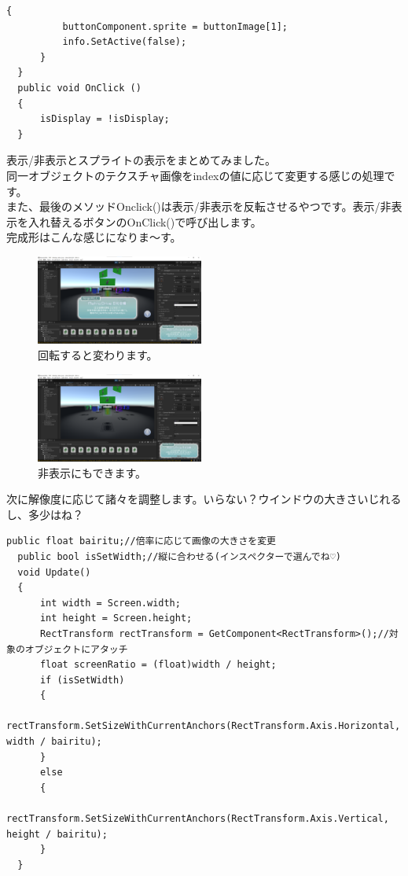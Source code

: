 \documentclass[b5paper,9pt,platex,dvipdfmx]{jsarticle}
\begin{document}
\begin{multicols*}{3}
\begin{lstlisting}[caption=UIDraw.cs]
      {
          buttonComponent.sprite = buttonImage[1];
          info.SetActive(false);
      }
  }
  public void OnClick ()
  {
      isDisplay = !isDisplay;
  }
\end{lstlisting}
表示/非表示とスプライトの表示をまとめてみました。\\
同一オブジェクトのテクスチャ画像をindexの値に応じて変更する感じの処理です。\\
また、最後のメソッドOnclick()は表示/非表示を反転させるやつです。表示/非表示を入れ替えるボタンのOnClick()で呼び出します。\\
完成形はこんな感じになりま～す。\\
\begin{figure}[H]
  \centering
  \includegraphics[width=5.5cm]{5.png}
  \caption{回転すると変わります。}
\end{figure}
\begin{figure}[H]
  \centering
  \includegraphics[width=5.5cm]{6.png}
  \caption{非表示にもできます。}
\end{figure}
次に解像度に応じて諸々を調整します。いらない？ウインドウの大きさいじれるし、多少はね？\\
\begin{lstlisting}[caption=DisplaySet.cs]
  public float bairitu;//倍率に応じて画像の大きさを変更
  public bool isSetWidth;//縦に合わせる(インスペクターで選んでね♡)
  void Update()
  {
      int width = Screen.width;
      int height = Screen.height;
      RectTransform rectTransform = GetComponent<RectTransform>();//対象のオブジェクトにアタッチ
      float screenRatio = (float)width / height;
      if (isSetWidth)
      {
          rectTransform.SetSizeWithCurrentAnchors(RectTransform.Axis.Horizontal, width / bairitu);
      }
      else
      {
          rectTransform.SetSizeWithCurrentAnchors(RectTransform.Axis.Vertical, height / bairitu);
      }
  }
\end{lstlisting}

\end{multicols*}
\end{document}
